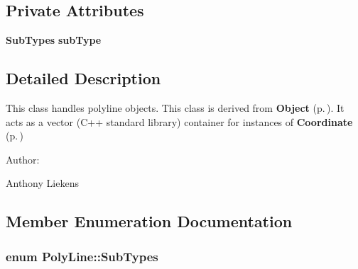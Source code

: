 \subsection*{Private Attributes}
\begin{CompactItemize}
\item 
{\bf Sub\-Types} {\bf sub\-Type}
\end{CompactItemize}


\subsection{Detailed Description}
This class handles polyline objects. This class is derived from {\bf Object} {\rm (p.\,\pageref{classObject})}. It acts as a vector (C++ standard library) container for instances of {\bf Coordinate} {\rm (p.\,\pageref{classCoordinate})} \begin{Desc}
\item[Author: ]\par
Anthony Liekens \end{Desc}




\subsection{Member Enumeration Documentation}
\subsubsection{\setlength{\rightskip}{0pt plus 5cm}enum Poly\-Line::Sub\-Types}\label{classPolyLine_s5}


